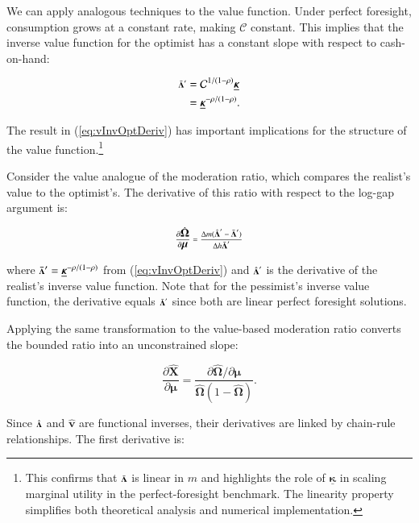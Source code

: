 \documentclass[twocolumn, switch]{article}
\newcommand{\CRRA}{\rho}
\newcommand{\mNrm}{m}
\newcommand{\vFunc}{\mathbf{v}}
\newcommand{\vInv}{{\scriptsize \boldsymbol{\Lambda}}}
\newcommand{\vInvOpt}{\bar{\vInv}}
\newcommand{\vInvReal}{\hat{\vInv}}
\newcommand{\hNrm}{h}
\newcommand{\MPC}{\boldsymbol{\kappa}}
\newcommand{\MPCmin}{\underline{\MPC}}
\newcommand{\logmNrmEx}{\boldsymbol{\mu}}
\newcommand{\mNrmEx}{\Delta \mNrm}
\newcommand{\hNrmEx}{\Delta \hNrm}
\newcommand{\PDVCoverc}{\mathcal{C}}
\newcommand{\vFuncReal}{\hat{\vFunc}}
\newcommand{\valModRte}{\boldsymbol{\Omega}}
\newcommand{\valModRteReal}{\hat{\valModRte}}
\newcommand{\logitValModRteReal}{\hat{\boldsymbol{X}}}
\newcommand{\vInvOptDeriv}{\vInvOpt'}
\newcommand{\vInvRealDeriv}{\vInvReal'}
\begin{document}
We can apply analogous techniques to the value function. Under perfect foresight, consumption grows at a constant rate, making $\PDVCoverc$ constant. This implies that the inverse value function for the optimist has a constant slope with respect to cash-on-hand:

\begin{equation}
\label{eq:vInvOptDeriv}
\begin{aligned}
\vInvOptDeriv &= \PDVCoverc^{1/(1-\CRRA)} \MPCmin \\
&= \MPCmin^{-\CRRA/(1-\CRRA)}.
\end{aligned}
\end{equation}

The result in (\ref{eq:vInvOptDeriv}) has important implications for the structure of the value function.\footnote{This confirms that $\vInvOpt$ is linear in $\mNrm$ and highlights the role of $\MPCmin$ in scaling marginal utility in the perfect-foresight benchmark. The linearity property simplifies both theoretical analysis and numerical implementation.}

Consider the value analogue of the moderation ratio, which compares the realist's value to the optimist's. The derivative of this ratio with respect to the log-gap argument is:

\begin{equation}
\label{eq:valModRteRealDerivmu}
\frac{\partial \valModRteReal}{\partial \logmNrmEx} = \frac{\mNrmEx (\vInvRealDeriv - \vInvOptDeriv)}{\hNrmEx \vInvOptDeriv}
\end{equation}

where $\vInvOptDeriv = \MPCmin^{ -\CRRA/(1 -\CRRA)}$ from (\ref{eq:vInvOptDeriv}) and $\vInvRealDeriv$ is the derivative of the realist's inverse value function. Note that for the pessimist's inverse value function, the derivative equals $\vInvOptDeriv$ since both are linear perfect foresight solutions.

Applying the same transformation to the value-based moderation ratio converts the bounded ratio into an unconstrained slope:

\begin{equation}
\label{eq:logitValModRteRealDerivmu}
\frac{\partial \logitValModRteReal}{\partial \logmNrmEx} = \frac{\partial \valModRteReal / \partial \logmNrmEx}{\valModRteReal(1-\valModRteReal)}.
\end{equation}

Since $\vInvReal$ and $\vFuncReal$ are functional inverses, their derivatives are linked by chain-rule relationships. The first derivative is:
\end{document}
